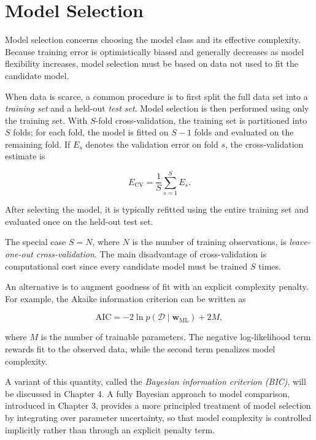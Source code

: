 \documentclass[10pt,twocolumn]{memoir}
\begin{document}
\section{Model Selection}

Model selection concerns choosing the model class and its effective complexity. Because training error is optimistically biased and generally decreases as model flexibility increases, model selection must be based on data not used to fit the candidate model.

When data is scarce, a common procedure is to first split the full data set into a \textit{training set} and a held-out \textit{test set}. Model selection is then performed using only the training set. With $S$-fold cross-validation, the training set is partitioned into $S$ folds; for each fold, the model is fitted on $S-1$ folds and evaluated on the remaining fold. If $E_s$ denotes the validation error on fold $s$, the cross-validation estimate is

\begin{equation}
    E_{\mathrm{CV}} = \frac{1}{S}\sum_{s=1}^{S} E_s.
\end{equation}

After selecting the model, it is typically refitted using the entire training set and evaluated once on the held-out test set.

The special case $S=N$, where $N$ is the number of training observations, is \textit{leave-one-out cross-validation}. The main disadvantage of cross-validation is computational cost since every candidate model must be trained $S$ times.

An alternative is to augment goodness of fit with an explicit complexity penalty. For example, the Akaike information criterion can be written as

\begin{equation}
    \mathrm{AIC} = -2\ln p(\mathcal{D}\mid\mathbf{w}_{\mathrm{ML}}) + 2M,
\end{equation}

where $M$ is the number of trainable parameters. The negative log-likelihood term rewards fit to the observed data, while the second term penalizes model complexity.

A variant of this quantity, called the \textit{Bayesian information criterion (BIC)}, will be discussed in Chapter 4. A fully Bayesian approach to model comparison, introduced in Chapter 3, provides a more principled treatment of model selection by integrating over parameter uncertainty, so that model complexity is controlled implicitly rather than through an explicit penalty term.
\end{document}

